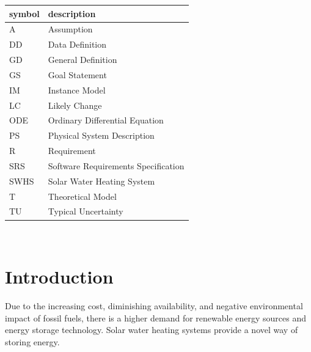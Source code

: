 \documentclass[12pt]{article}
\newcommand{\progname}{SWHS}
\begin{document}
\renewcommand{\arraystretch}{1.2}
\begin{tabular}{l l} 
  \toprule		
  \textbf{symbol} & \textbf{description}\\
  \midrule 
  A & Assumption\\
  DD & Data Definition\\
  GD & General Definition\\
  GS & Goal Statement\\
  IM & Instance Model\\
  LC & Likely Change\\
  ODE & Ordinary Differential Equation\\
  PS & Physical System Description\\
  R & Requirement\\
  SRS & Software Requirements Specification\\
  \progname{} & Solar Water Heating System\\
  T & Theoretical Model\\
TU & Typical Uncertainty\\
  \bottomrule
\end{tabular}\\

\section{Introduction}

Due to the increasing cost, diminishing availability, and negative environmental
impact of fossil fuels, there is a higher demand for renewable energy sources
and energy storage technology.  Solar water heating systems
provide a novel way of
storing energy.%



\end{document}
